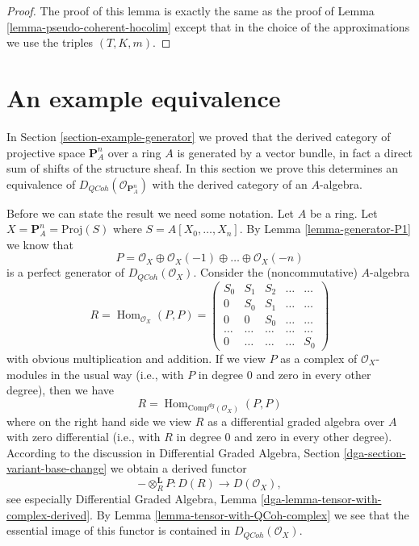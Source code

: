 \documentclass{stacks-project}
\theoremstyle{plain}
\theoremstyle{definition}
\theoremstyle{remark}
\numberwithin{equation}{subsection}
\def\Hom{\mathop{\mathrm{Hom}}\nolimits}
\def\QCoh{\mathit{QCoh}}
\begin{document}
\begin{proof}
The proof of this lemma is exactly the same as the proof of
Lemma \ref{lemma-pseudo-coherent-hocolim}
except that in the choice of the approximations we use
the triples $(T, K, m)$.
\end{proof}









\section{An example equivalence}
\label{section-example-equivalence}

\noindent
In Section \ref{section-example-generator}
we proved that the derived category of projective space $\mathbf{P}^n_A$
over a ring $A$ is generated by a vector bundle, in fact a direct
sum of shifts of the structure sheaf. In this section we prove this
determines an equivalence of $D_\QCoh(\mathcal{O}_{\mathbf{P}^n_A})$
with the derived category of an $A$-algebra.

\medskip\noindent
Before we can state the result we need some notation.
Let $A$ be a ring. Let $X = \mathbf{P}^n_A = \text{Proj}(S)$
where $S = A[X_0, \ldots, X_n]$. By Lemma \ref{lemma-generator-P1}
we know that
\begin{equation}
\label{equation-generator-Pn}
P =
\mathcal{O}_X \oplus \mathcal{O}_X(-1) \oplus \ldots \oplus \mathcal{O}_X(-n)
\end{equation}
is a perfect generator of $D_\QCoh(\mathcal{O}_X)$.
Consider the (noncommutative) $A$-algebra
\begin{equation}
\label{equation-algebra-for-Pn}
R = \Hom_{\mathcal{O}_X}(P, P) =
\left(
\begin{matrix}
S_0 & S_1 & S_2 & \ldots & \ldots \\
0 & S_0 & S_1 & \ldots & \ldots\\
0 & 0 & S_0 & \ldots & \ldots \\
\ldots & \ldots & \ldots & \ldots & \ldots \\
0 & \ldots & \ldots & \ldots & S_0
\end{matrix}
\right)
\end{equation}
with obvious multiplication and addition. If we view $P$ as a complex
of $\mathcal{O}_X$-modules in the usual way (i.e., with $P$ in degree $0$
and zero in every other degree), then we have
$$
R = \Hom_{\text{Comp}^{dg}(\mathcal{O}_X)}(P, P)
$$
where on the right hand side we view $R$ as a differential graded algebra
over $A$
with zero differential (i.e., with $R$ in degree $0$ and zero in every
other degree). According to the discussion in
Differential Graded Algebra, Section \ref{dga-section-variant-base-change}
we obtain a derived functor
$$
- \otimes_R^\mathbf{L} P : D(R) \longrightarrow D(\mathcal{O}_X),
$$
see especially Differential Graded Algebra, Lemma
\ref{dga-lemma-tensor-with-complex-derived}.
By Lemma \ref{lemma-tensor-with-QCoh-complex}
we see that the essential image of this functor
is contained in $D_\QCoh(\mathcal{O}_X)$.
\end{document}
